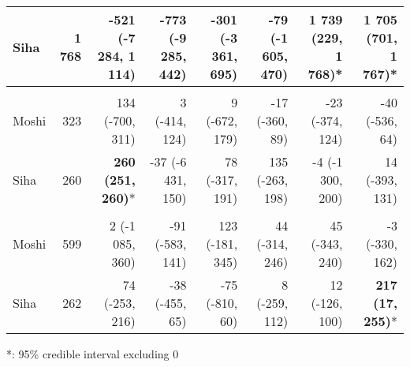 \begin{table}[t]
\begin{tabular*}{\linewidth}{@{\extracolsep{\fill}}l|rrrrrrr}
Siha & 1 768 & -521 (-7 284, 1 114) & -773 (-9 285, 442) & -301 (-3 361, 695) & -79 (-1 605, 470) & \textbf{1 739 (229, 1 768)}* & \textbf{1 705 (701, 1 767)}* \\ 
\midrule\addlinespace[2.5pt]
\multicolumn{8}{l}{Leprosy} \\[2.5pt] 
\midrule\addlinespace[2.5pt]
Moshi & 323 & 134 (-700, 311) & 3 (-414, 124) & 9 (-672, 179) & -17 (-360, 89) & -23 (-374, 124) & -40 (-536, 64) \\ 
Siha & 260 & \textbf{260 (251, 260)}* & -37 (-6 431, 150) & 78 (-317, 191) & 135 (-263, 198) & -4 (-1 300, 200) & 14 (-393, 131) \\ 
\midrule\addlinespace[2.5pt]
\multicolumn{8}{l}{Schistosomiasis} \\[2.5pt] 
\midrule\addlinespace[2.5pt]
Moshi & 599 & 2 (-1 085, 360) & -91 (-583, 141) & 123 (-181, 345) & 44 (-314, 246) & 45 (-343, 240) & -3 (-330, 162) \\ 
Siha & 262 & 74 (-253, 216) & -38 (-455, 65) & -75 (-810, 60) & 8 (-259, 112) & 12 (-126, 100) & \textbf{217 (17, 255)}* \\ 
\bottomrule
\end{tabular*}
\begin{minipage}{\linewidth}
*: 95\% credible interval excluding 0\\
\end{minipage}
\end{table}

